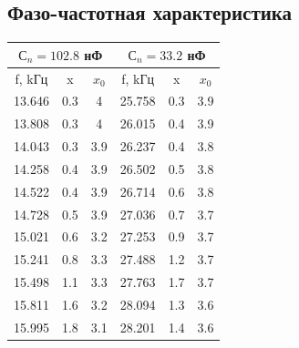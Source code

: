 \documentclass[a4paper, 12pt]{article}%
\begin{document}
	\subsection*{Фазо-частотная характеристика}
	\begin{table}[H]
		\centering
		\begin{tabular}{|ccc|ccc|}
			\hline
			\multicolumn{3}{|c|}{$С_n=102.8$   нФ}                            & \multicolumn{3}{c|}{$С_n=33.2$ нФ}                               \\ \hline
			\multicolumn{1}{|c|}{f, kГц} & \multicolumn{1}{c|}{x}   & $x_0$ & \multicolumn{1}{c|}{f, kГц} & \multicolumn{1}{c|}{x}   & $x_0$ \\ \hline
			\multicolumn{1}{|c|}{13.646} & \multicolumn{1}{c|}{0.3} & 4   & \multicolumn{1}{c|}{25.758} & \multicolumn{1}{c|}{0.3} & 3.9 \\ \hline
			\multicolumn{1}{|c|}{13.808} & \multicolumn{1}{c|}{0.3} & 4   & \multicolumn{1}{c|}{26.015} & \multicolumn{1}{c|}{0.4} & 3.9 \\ \hline
			\multicolumn{1}{|c|}{14.043} & \multicolumn{1}{c|}{0.3} & 3.9 & \multicolumn{1}{c|}{26.237} & \multicolumn{1}{c|}{0.4} & 3.8 \\ \hline
			\multicolumn{1}{|c|}{14.258} & \multicolumn{1}{c|}{0.4} & 3.9 & \multicolumn{1}{c|}{26.502} & \multicolumn{1}{c|}{0.5} & 3.8 \\ \hline
			\multicolumn{1}{|c|}{14.522} & \multicolumn{1}{c|}{0.4} & 3.9 & \multicolumn{1}{c|}{26.714} & \multicolumn{1}{c|}{0.6} & 3.8 \\ \hline
			\multicolumn{1}{|c|}{14.728} & \multicolumn{1}{c|}{0.5} & 3.9 & \multicolumn{1}{c|}{27.036} & \multicolumn{1}{c|}{0.7} & 3.7 \\ \hline
			\multicolumn{1}{|c|}{15.021} & \multicolumn{1}{c|}{0.6} & 3.2 & \multicolumn{1}{c|}{27.253} & \multicolumn{1}{c|}{0.9} & 3.7 \\ \hline
			\multicolumn{1}{|c|}{15.241} & \multicolumn{1}{c|}{0.8} & 3.3 & \multicolumn{1}{c|}{27.488} & \multicolumn{1}{c|}{1.2} & 3.7 \\ \hline
			\multicolumn{1}{|c|}{15.498} & \multicolumn{1}{c|}{1.1} & 3.3 & \multicolumn{1}{c|}{27.763} & \multicolumn{1}{c|}{1.7} & 3.7 \\ \hline
			\multicolumn{1}{|c|}{15.811} & \multicolumn{1}{c|}{1.6} & 3.2 & \multicolumn{1}{c|}{28.094} & \multicolumn{1}{c|}{1.3} & 3.6 \\ \hline
			\multicolumn{1}{|c|}{15.995} & \multicolumn{1}{c|}{1.8} & 3.1 & \multicolumn{1}{c|}{28.201} & \multicolumn{1}{c|}{1.4} & 3.6 \\ \hline

\end{tabular}
\end{table}
\end{document}
